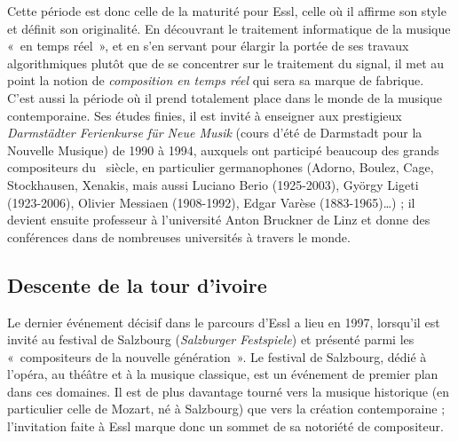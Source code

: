 \documentclass[a4paper,12pt]{article}
\newcommand{\guill}[1]{«~#1~»}
\newcommand{\zitat}[2]{\#Citation(#2)\#}
\begin{document}



Cette période est donc celle de la maturité pour Essl, celle où il affirme son style et définit son originalité. En découvrant le traitement informatique de la musique \guill{en temps réel}, et en s'en servant pour élargir la portée de ses travaux algorithmiques plutôt que de se concentrer sur le traitement du signal, il met au point la notion de \emph{composition en temps réel} qui sera sa marque de fabrique. C'est aussi la période où il prend totalement place dans le monde de la musique contemporaine. Ses études finies, il est invité à enseigner aux prestigieux \emph{Darmstädter Ferienkurse für Neue Musik} (cours d'été de Darmstadt pour la Nouvelle Musique) de 1990 à 1994, auxquels ont participé beaucoup des grands compositeurs du \XXe~siècle, en particulier germanophones (Adorno, Boulez, Cage, Stockhausen, Xenakis, mais aussi Luciano Berio (1925-2003), György Ligeti (1923-2006), Olivier Messiaen (1908-1992), Edgar Varèse (1883-1965)\dots) ; il devient ensuite professeur à l'université Anton Bruckner de Linz et donne des conférences dans de nombreuses universités à travers le monde.


\subsection{Descente de la tour d'ivoire}
\label{liberte}

Le dernier événement décisif dans le parcours d'Essl a lieu en 1997, lorsqu'il est invité au festival de Salzbourg (\emph{Salzburger Festspiele}) et présenté parmi les \guill{compositeurs de la nouvelle génération}. Le festival de Salzbourg, dédié à l'opéra, au théâtre et à la musique classique, est un événement de premier plan dans ces domaines. Il est de plus davantage tourné vers la musique historique (en particulier celle de Mozart, né à Salzbourg) que vers la création contemporaine ; l'invitation faite à Essl marque donc un sommet de sa notoriété de compositeur.
\end{document}

